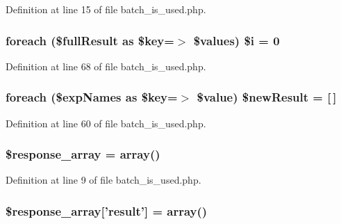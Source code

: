 Definition at line 15 of file batch\-\_\-is\-\_\-used.\-php.

\hypertarget{batch__is__used_8php_ac2cff670cd6bb522803dae2768c136c7}{
\subsubsection[{\$i}]{\setlength{\rightskip}{0pt plus 5cm}foreach (\$full\-Result as \$key=$>$ \$values) \$i = 0}}\label{batch__is__used_8php_ac2cff670cd6bb522803dae2768c136c7}


Definition at line 68 of file batch\-\_\-is\-\_\-used.\-php.

\hypertarget{batch__is__used_8php_af9b19996aa7a415218a214650987ebc9}{
\subsubsection[{\$new\-Result}]{\setlength{\rightskip}{0pt plus 5cm}foreach (\$exp\-Names as \$key=$>$ \$value) \$new\-Result = \mbox{[}$\,$\mbox{]}}}\label{batch__is__used_8php_af9b19996aa7a415218a214650987ebc9}


Definition at line 60 of file batch\-\_\-is\-\_\-used.\-php.

\hypertarget{batch__is__used_8php_a6c0fd6f414374ab1b1e16b2a4b625004}{
\subsubsection[{\$response\-\_\-array}]{\setlength{\rightskip}{0pt plus 5cm}\$response\-\_\-array = array()}}\label{batch__is__used_8php_a6c0fd6f414374ab1b1e16b2a4b625004}


Definition at line 9 of file batch\-\_\-is\-\_\-used.\-php.

\hypertarget{batch__is__used_8php_ada5564dc28774e85d6fea1465312dba4}{
\subsubsection[{\$response\-\_\-array}]{\setlength{\rightskip}{0pt plus 5cm}\$response\-\_\-array\mbox{[}'result'\mbox{]} = array()}}\label{batch__is__used_8php_ada5564dc28774e85d6fea1465312dba4}


